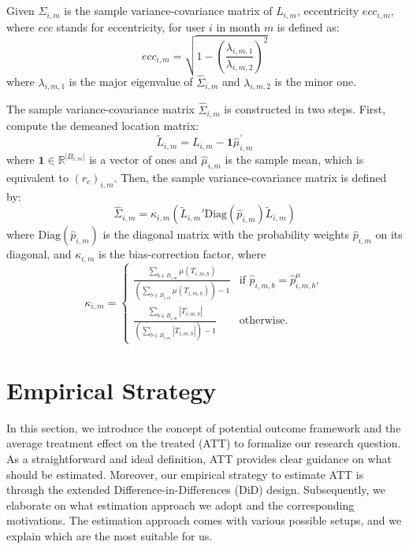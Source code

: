 \begin{definition}[Eccentricity]
Given $\hat{\Sigma}_{i, m}$ is the sample variance-covariance matrix of $L_{i, m}$, eccentricity $ecc_{i, m}$, where $ecc$ stands for eccentricity, for user $i$ in month $m$ is defined as:
\[
ecc_{i, m}
=
\sqrt{
    1
    -
    \left(
        \frac{\lambda_{i, m, 1}}{\lambda_{i, m, 2}}
    \right)^2
}
\]
where $\lambda_{i, m, 1}$ is the major eigenvalue of $\hat{\Sigma}_{i, m}$ and $\lambda_{i, m, 2}$ is the minor one.
\end{definition}

The sample variance-covariance matrix $\hat{\Sigma}_{i, m}$ is constructed in two steps.
First, compute the demeaned location matrix:
\[
\tilde{L}_{i, m}
=
L_{i, m}
-
\mathbf{1}\hat{\mu}_{i, m}^{'}
\]
where $\mathbf{1} \in \mathbb{R}^{\lvert B_{i, m} \rvert }$ is a vector of ones and $\hat{\mu}_{i, m}$ is the sample mean, which is equivalent to $(r_c)_{i, m}$.
Then, the sample variance-covariance matrix is defined by:
\[
\hat{\Sigma}_{i, m}
=
\kappa_{i, m} (
    \tilde{L}_{i, m}'
    \text{Diag}(\hat{p}_{i, m})
    \tilde{L}_{i, m}
)
\]
where $\text{Diag}(\hat{p}_{i, m})$ is the diagonal matrix with the probability weights $\hat{p}_{i, m}$ on its diagonal, and $\kappa_{i, m}$ is the bias-correction factor, where
\[
\kappa_{i, m} =
\begin{cases}
\frac{
\sum_{b \in B_{i, m}} \mu(T_{i, m, b})
}{
\left( \sum_{b \in B_{i, m}} \mu(T_{i, m, b}) \right) - 1
} & \text{if } \hat{p}_{i, m, b} = \hat{p}^{\mu}_{i, m, b}, \\[0.5em]
\frac{
\sum_{b \in B_{i, m}} |T_{i, m, b}|
}{
\left( \sum_{b \in B_{i, m}} |T_{i, m, b}| \right) - 1
} & \text{otherwise}.
\end{cases}
\]



\clearpage\newpage
\section{Empirical Strategy}
In this section, we introduce the concept of potential outcome framework and the average treatment effect on the treated (ATT) to formalize our research question.
As a straightforward and ideal definition, ATT provides clear guidance on what should be estimated.
Moreover, our empirical strategy to estimate ATT is through the extended Difference-in-Differences (DiD) design.
Subsequently, we elaborate on what estimation approach we adopt and the corresponding motivations.
The estimation approach comes with various possible setups, and we explain which are the most suitable for us.

